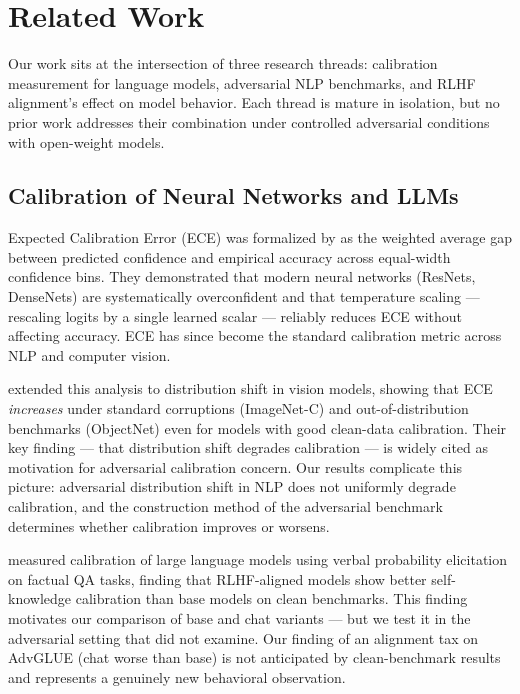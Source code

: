 \section{Related Work}
\label{sec:related}

Our work sits at the intersection of three research threads: calibration measurement for language models, adversarial NLP benchmarks, and RLHF alignment's effect on model behavior. Each thread is mature in isolation, but no prior work addresses their combination under controlled adversarial conditions with open-weight models.

\subsection{Calibration of Neural Networks and LLMs}

Expected Calibration Error (ECE) was formalized by \citet{guo2017calibration} as the weighted average gap between predicted confidence and empirical accuracy across equal-width confidence bins. They demonstrated that modern neural networks (ResNets, DenseNets) are systematically overconfident and that temperature scaling --- rescaling logits by a single learned scalar --- reliably reduces ECE without affecting accuracy. ECE has since become the standard calibration metric across NLP and computer vision.

\citet{minderer2021revisiting} extended this analysis to distribution shift in vision models, showing that ECE \textit{increases} under standard corruptions (ImageNet-C) and out-of-distribution benchmarks (ObjectNet) even for models with good clean-data calibration. Their key finding --- that distribution shift degrades calibration --- is widely cited as motivation for adversarial calibration concern. Our results complicate this picture: adversarial distribution shift in NLP does not uniformly degrade calibration, and the construction method of the adversarial benchmark determines whether calibration improves or worsens.

\citet{kadavath2022language} measured calibration of large language models using verbal probability elicitation on factual QA tasks, finding that RLHF-aligned models show better self-knowledge calibration than base models on clean benchmarks. This finding motivates our comparison of base and chat variants --- but we test it in the adversarial setting that \citet{kadavath2022language} did not examine. Our finding of an alignment tax on AdvGLUE (chat worse than base) is not anticipated by clean-benchmark results and represents a genuinely new behavioral observation.

